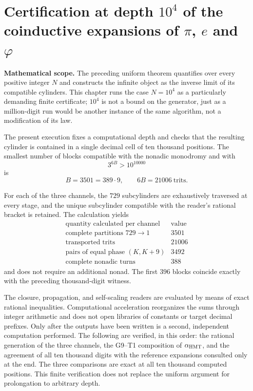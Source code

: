 \section{Certification at depth \texorpdfstring{\(10^4\)}{10^4} of the coinductive expansions of \texorpdfstring{\(\pi\), \(e\) and \(\varphi\)}{pi, e, and phi}}
\label{sec:truncamiento-10000-pi-e-phi-rev9}

\noindent\textbf{Mathematical scope.}
The preceding uniform theorem quantifies over every positive integer \(N\) and
constructs the infinite object as the inverse limit of its compatible cylinders.
This chapter runs the case \(N=10^4\) as a particularly demanding finite
certificate; \(10^4\) is not a bound on the generator, just as a
million-digit run would be another instance of the same algorithm, not a
modification of its law.

The present execution fixes a computational depth and checks that the
resulting cylinder is contained in a single decimal cell of ten thousand
positions. The smallest number of blocks compatible with the nonadic monodromy
and with
\[
  3^{6B}>10^{10000}
\]
is
\[
  B=3501=389\cdot9,
  \qquad 6B=21006\ \text{trits}.
\]

For each of the three channels, the \(729\) subcylinders are exhaustively
traversed at every stage, and the unique subcylinder compatible with the reader's
rational bracket is retained. The calculation yields
\[
 \begin{array}{c|r}
 \text{quantity calculated per channel}&\text{value}\\
 \hline
 \text{complete partitions }729\to1&3501\\
 \text{transported trits}&21006\\
 \text{pairs of equal phase }(K,K+9)&3492\\
 \text{complete nonadic turns}&388
 \end{array}
\]
and does not require an additional nonad. The first \(396\) blocks
coincide exactly with the preceding thousand-digit witness.

The closure, propagation, and self-scaling readers are evaluated by means of
exact rational inequalities. Computational acceleration reorganizes the sums
through integer arithmetic and does not open libraries of constants or target
decimal prefixes. Only after the outputs have been written is a second,
independent computation performed. The following are verified, in this order:
the rational generation of the three channels, the G9--T1 composition of
\(\alpha_{\rm HMT}\), and the agreement of all ten thousand digits with the
reference expansions consulted only at the end. The three comparisons are
exact at all ten thousand computed positions. This finite verification does
not replace the uniform argument for prolongation to arbitrary depth.

